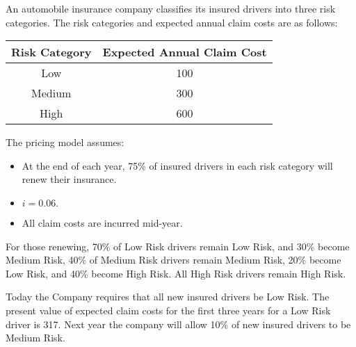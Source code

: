 An automobile insurance company classifies its insured drivers into three risk categories. 
The risk categories and expected annual claim costs are as follows:
\begin{center}\begin{tabular}{cc} Risk Category & Expected Annual Claim Cost \\ \hline  Low & 100 \\ Medium & 300 \\ High & 600 \end{tabular}\end{center}
The pricing model assumes:
\begin{itemize}
\item At the end of each year, 75\% of insured drivers in each risk category will renew their insurance.
\item $i=0.06.$
\item All claim costs are incurred mid-year.
\end{itemize}
For those renewing, 70\% of Low Risk drivers remain Low Risk, and 30\% become Medium Risk,
40\% of Medium Risk drivers remain Medium Risk, 20\% become Low Risk, and 40\% become High Risk. 
All High Risk drivers remain High Risk.

\medskip

Today the Company requires that all new insured drivers be Low Risk. The present value of expected claim costs for the 
first three years for a Low Risk driver is 317. Next year the company will allow 10\% of new 
insured drivers to be Medium Risk.

